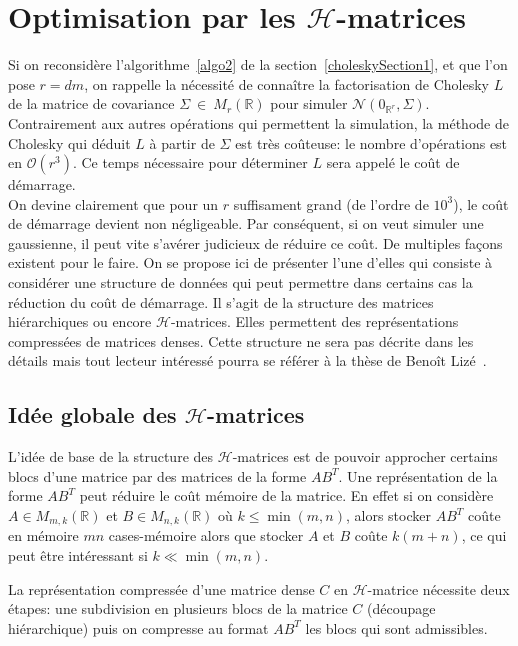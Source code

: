 \chapter{Optimisation par les $\mathcal{H}$-matrices}
\label{hmatrixchapter}
Si on reconsidère l'algorithme~\ref{algo2} de la section~\ref{choleskySection1},
et que l'on pose $r = dm$, on rappelle la nécessité de connaître la factorisation de Cholesky $L$ de la
matrice de covariance $\Sigma~\in~M_{r}(\mathbb{R}) $ pour simuler $\mathcal{N}(0_{\mathbb{R}^{r}},\Sigma)$. Contrairement aux autres
opérations qui permettent la simulation, la méthode de Cholesky qui déduit
$L$ à partir de $\Sigma$ est très coûteuse: le nombre d'opérations est en
$\mathcal{O}(r^3)$. Ce temps nécessaire
pour déterminer $L$ sera appelé le coût de démarrage.\\
On devine clairement que pour un $r$ suffisament grand (de l'ordre de $10^3$), le coût
de démarrage devient non négligeable. Par conséquent, si on veut
simuler une gaussienne, il peut vite s'avérer judicieux de
réduire ce coût. De multiples façons existent pour le faire. On se propose ici
de présenter l'une d'elles qui consiste à considérer une structure de données
qui peut permettre dans certains cas la réduction du coût de démarrage. Il
s'agit de la structure des matrices hiérarchiques ou encore $\mathcal{H}$-matrices. Elles permettent des représentations compressées de matrices denses. Cette structure ne sera pas décrite dans les détails mais tout lecteur intéressé pourra se référer à la thèse de Benoît Lizé~\cite{LizéBenoît2014Rdrp}.

\section{Idée globale des $\mathcal{H}$-matrices}

L'idée de base de la structure des $\mathcal{H}$-matrices est de pouvoir
approcher certains blocs d'une matrice par 
des matrices de la forme $AB^{T}$. Une représentation de la forme $AB^{T}$ peut réduire
le coût mémoire de la matrice. En effet si on considère $A \in M_{m,k}(\mathbb{R})$ et $B \in M_{n,k}(\mathbb{R})$ où $k \leq  \min(m,n)$, alors stocker $AB^{T}$ coûte en mémoire
$mn$ cases-mémoire alors que stocker $A$ et $B$ coûte $k(m+n)$, ce qui peut être intéressant si $k \ll \min(m,n)$.

La représentation compressée d'une matrice dense $C$ en $\mathcal{H}$-matrice nécessite deux étapes: une subdivision en plusieurs blocs de la matrice $C$ (découpage hiérarchique) puis
on compresse au format $AB^{T}$ les blocs qui sont admissibles.

